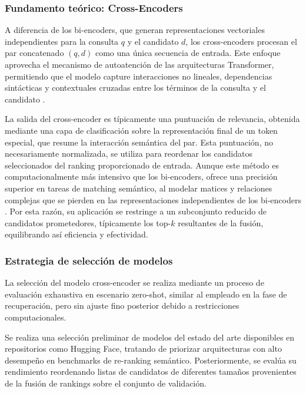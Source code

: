 \subsubsection{Fundamento teórico: Cross-Encoders}

\noindent A diferencia de los bi-encoders, que generan representaciones vectoriales independientes para la consulta $q$ y el candidato $d$, los cross-encoders procesan el par concatenado $(q, d)$ como una única secuencia de entrada. Este enfoque aprovecha el mecanismo de autoatención de las arquitecturas Transformer, permitiendo que el modelo capture interacciones no lineales, dependencias sintácticas y contextuales cruzadas entre los términos de la consulta y el candidato \cite{vaswani2017attention}. 

La salida del cross-encoder es típicamente una puntuación de relevancia, obtenida mediante una capa de clasificación sobre la representación final de un token especial, que resume la interacción semántica del par. Esta puntuación, no necesariamente normalizada, se utiliza para reordenar los candidatos seleccionados del ranking proporcionado de entrada. Aunque este método es computacionalmente más intensivo que los bi-encoders, ofrece una precisión superior en tareas de matching semántico, al modelar matices y relaciones complejas que se pierden en las representaciones independientes de los bi-encoders \cite{nogueira2019passage}. Por esta razón, su aplicación se restringe a un subconjunto reducido de candidatos prometedores, típicamente los top-$k$ resultantes de la fusión, equilibrando así eficiencia y efectividad.

\subsubsection{Estrategia de selección de modelos}

\noindent La selección del modelo cross-encoder se realiza mediante un proceso de evaluación exhaustiva en escenario zero-shot, similar al empleado en la fase de recuperación, pero sin ajuste fino posterior debido a restricciones computacionales. 

Se realiza una selección preliminar de modelos del estado del arte disponibles en repositorios como Hugging Face, tratando de priorizar arquitecturas con alto desempeño en benchmarks de re-ranking semántico. Posteriormente, se evalúa su rendimiento reordenando listas de candidatos de diferentes tamaños provenientes de la fusión de rankings sobre el conjunto de validación.

